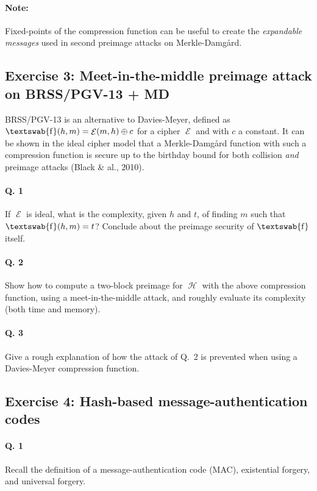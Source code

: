\documentclass[11pt,a4paper]{article}
\DeclareMathOperator\hash{\mathcal{H}}
\DeclareMathOperator\E{\mathcal{E}}
\DeclareMathOperator\comp{\textswab{f}}
\begin{document}
\paragraph{Note:} Fixed-points of the compression function can be useful to create the \emph{expandable messages} used in second preimage attacks on Merkle-Damg\aa rd.


\subsection*{Exercise 3: Meet-in-the-middle preimage attack on BRSS/PGV-13 + MD}
BRSS/PGV-13 is an alternative to Davies-Meyer, defined as $\comp(h,m) = \E(m,h) \oplus c$ for a cipher $\E$ and with $c$ a constant.
It can be shown in the ideal cipher model that
a Merkle-Damg\aa rd function with such a compression function is secure up to the birthday bound for both collision \emph{and} preimage attacks (Black \& al., 2010).

\paragraph{Q. 1} If $\E$ is ideal, what is the complexity, given $h$ and $t$, of finding $m$ such that $\comp(h, m) = t$? Conclude about the preimage security
of $\comp$ itself.

\paragraph{Q. 2} Show how to compute a two-block preimage for $\hash$ with the above compression function, using a
meet-in-the-middle attack, and roughly evaluate its complexity (both time and memory).

\paragraph{Q. 3} Give a rough explanation of how the attack of Q.~2 is prevented when using a Davies-Meyer compression function.

\subsection*{Exercise 4: Hash-based message-authentication codes}

\paragraph{Q. 1} Recall the definition of a message-authentication code (MAC), existential forgery, and universal forgery.
\end{document}
